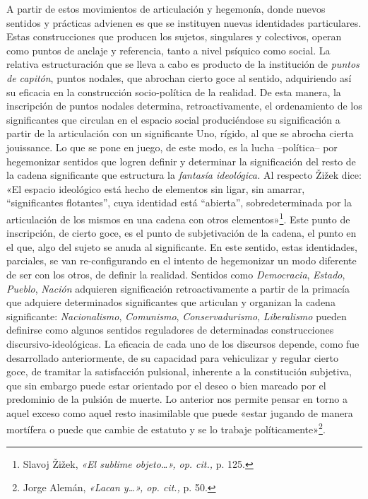 A partir de estos movimientos de articulación y hegemonía, donde nuevos sentidos y prácticas advienen es que se instituyen nuevas identidades particulares. Estas construcciones que producen los sujetos, singulares y colectivos, operan como puntos de anclaje y referencia, tanto a nivel psíquico como social. La relativa estructuración que se lleva a cabo es producto de la institución de \emph{puntos de capitón}, puntos nodales, que abrochan cierto goce al sentido, adquiriendo así su eficacia en la construcción socio-política de la realidad. De esta manera, la inscripción de puntos nodales determina, retroactivamente, el ordenamiento de los significantes que circulan en el espacio social produciéndose su significación a partir de la articulación con un significante Uno, rígido, al que se abrocha cierta jouissance. Lo que se pone en juego, de este modo, es la lucha --política-- por hegemonizar sentidos que logren definir y determinar la significación del resto de la cadena significante que estructura la \emph{fantasía ideológica.} Al respecto Žižek dice: «El espacio ideológico está hecho de elementos sin ligar, sin amarrar, ``significantes flotantes'', cuya identidad está ``abierta'', sobredeterminada por la articulación de los mismos en una cadena con otros elementos»\footnote{Slavoj Žižek, \emph{«El sublime objeto\ldots», op. cit.,} p. 125.}. Este punto de inscripción, de cierto goce, es el punto de subjetivación de la cadena, el punto en el que, algo del sujeto se anuda al significante. En este sentido, estas identidades, parciales, se van re-configurando en el intento de hegemonizar un modo diferente de ser con los otros, de definir la realidad. Sentidos como \emph{Democracia}, \emph{Estado}, \emph{Pueblo}, \emph{Nación} adquieren significación retroactivamente a partir de la primacía que adquiere determinados significantes que articulan y organizan la cadena significante: \emph{Nacionalismo}, \emph{Comunismo}, \emph{Conservadurismo}, \emph{Liberalismo} pueden definirse como algunos sentidos reguladores de determinadas construcciones discursivo-ideológicas. La eficacia de cada uno de los discursos depende, como fue desarrollado anteriormente, de su capacidad para vehiculizar y regular cierto goce, de tramitar la satisfacción pulsional, inherente a la constitución subjetiva, que sin embargo puede estar orientado por el deseo o bien marcado por el predominio de la pulsión de muerte. Lo anterior nos permite pensar en torno a aquel exceso como aquel resto inasimilable que puede «estar jugando de manera mortífera o puede que cambie de estatuto y se lo trabaje políticamente»\footnote{Jorge Alemán, \emph{«Lacan y\ldots», op. cit.,} p. 50.}.

